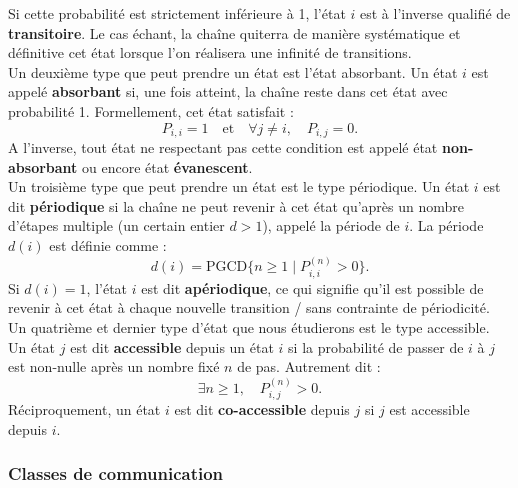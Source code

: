 \documentclass{article}
\begin{document}
Si cette probabilité est strictement inférieure à 1, l'état $i$ est à l'inverse qualifié de \textbf{transitoire}. Le cas échant, la chaîne quiterra de manière systématique et définitive cet état lorsque l'on réalisera une infinité de transitions. \\

Un deuxième type que peut prendre un état est l'état absorbant.
Un état $i$ est appelé \textbf{absorbant} si, une fois atteint, la chaîne reste dans cet état avec probabilité 1. Formellement, cet état satisfait :
\[
P_{i,i} = 1 \quad \text{et} \quad \forall j \neq i, \quad P_{i,j} = 0.
\]
A l'inverse, tout état ne respectant pas cette condition est appelé état \textbf{non-absorbant} ou encore état \textbf{évanescent}. \\

Un troisième type que peut prendre un état est le type périodique.
Un état $i$ est dit \textbf{périodique} si la chaîne ne peut revenir à cet état qu'après un nombre d'étapes multiple (un certain entier $d > 1$), appelé la période de $i$. La période $d(i)$ est définie comme :
\[
d(i) = \text{PGCD}\{n \geq 1 \mid P_{i,i}^{(n)} > 0\}.
\]
Si $d(i) = 1$, l'état $i$ est dit \textbf{apériodique}, ce qui signifie qu'il est possible de revenir à cet état à chaque nouvelle transition /  sans contrainte de périodicité. \\

Un quatrième et dernier type d'état que nous étudierons est le type accessible.
Un état $j$ est dit \textbf{accessible} depuis un état $i$ si la probabilité de passer de $i$ à $j$ est non-nulle après un nombre fixé $n$ de pas. Autrement dit :
\[
\exists n \geq 1, \quad P_{i,j}^{(n)} > 0.
\]
Réciproquement, un état $i$ est dit \textbf{co-accessible} depuis $j$ si $j$ est accessible depuis $i$.


\subsubsection{Classes de communication}
\end{document}
